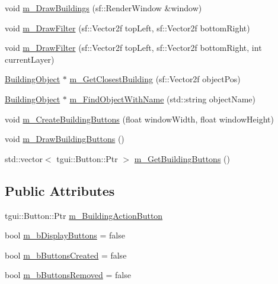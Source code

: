 \begin{DoxyCompactItemize}
\item 
void \mbox{\hyperlink{class_building_manager_a0d93750385afe5dacbfb87ee0892bf65}{m\+\_\+\+Draw\+Buildings}} (sf\+::\+Render\+Window \&window)
\item 
void \mbox{\hyperlink{class_building_manager_a0e73c63a55ff4aea0580565c8b4739b2}{m\+\_\+\+Draw\+Filter}} (sf\+::\+Vector2f top\+Left, sf\+::\+Vector2f bottom\+Right)
\item 
void \mbox{\hyperlink{class_building_manager_a6f456c69a3a406162e426584f815f8ea}{m\+\_\+\+Draw\+Filter}} (sf\+::\+Vector2f top\+Left, sf\+::\+Vector2f bottom\+Right, int current\+Layer)
\item 
\mbox{\hyperlink{class_building_object}{Building\+Object}} $\ast$ \mbox{\hyperlink{class_building_manager_adc2e37c83d693c994abccb089fe759e6}{m\+\_\+\+Get\+Closest\+Building}} (sf\+::\+Vector2f object\+Pos)
\item 
\mbox{\hyperlink{class_building_object}{Building\+Object}} $\ast$ \mbox{\hyperlink{class_building_manager_aa0d3cee7f0f10b931eec6ec94aed54fa}{m\+\_\+\+Find\+Object\+With\+Name}} (std\+::string object\+Name)
\item 
void \mbox{\hyperlink{class_building_manager_ac4fcc17f3333c5c51e00192688fb305e}{m\+\_\+\+Create\+Building\+Buttons}} (float window\+Width, float window\+Height)
\item 
void \mbox{\hyperlink{class_building_manager_a20e557f17b3685f0c6100584da487c12}{m\+\_\+\+Draw\+Building\+Buttons}} ()
\item 
std\+::vector$<$ tgui\+::\+Button\+::\+Ptr $>$ \mbox{\hyperlink{class_building_manager_a39cf73d7195ba35a0151470298c73724}{m\+\_\+\+Get\+Building\+Buttons}} ()
\end{DoxyCompactItemize}
\subsection*{Public Attributes}
\begin{DoxyCompactItemize}
\item 
tgui\+::\+Button\+::\+Ptr \mbox{\hyperlink{class_building_manager_a73319ea38914344dd2f10343bc224781}{m\+\_\+\+Building\+Action\+Button}}
\item 
bool \mbox{\hyperlink{class_building_manager_ab8250b9959e2cac047682b905e87e552}{m\+\_\+b\+Display\+Buttons}} = false
\item 
bool \mbox{\hyperlink{class_building_manager_a8e0316f32edc4c9be66f69fc0be86442}{m\+\_\+b\+Buttons\+Created}} = false
\item 
bool \mbox{\hyperlink{class_building_manager_a211d06d6db5ad2f5a449465eea816b30}{m\+\_\+b\+Buttons\+Removed}} = false
\end{DoxyCompactItemize}


